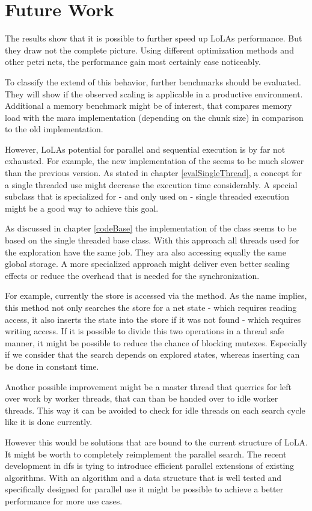 \chapter{Future Work}
The results show that it is possible to further speed up LoLAs performance. But they draw not the complete picture. Using different optimization methods and other petri nets, the performance gain most certainly ease noticeably.

To classify the extend of this behavior, further benchmarks should be evaluated. They will show if the observed scaling is applicable in a productive environment. Additional a memory benchmark might be of interest, that compares memory load with the mara implementation (depending on the chunk size) in comparison to the old implementation.

However, LoLAs potential for parallel and sequential execution is by far not exhausted. For example, the new implementation of the  seems to be much slower than the previous version. As stated in chapter \ref{evalSingleThread}, a concept for a single threaded use might decrease the execution time considerably. A special subclass that is specialized for - and only used on - single threaded execution might be a good way to achieve this goal.

As discussed in chapter \ref{codeBase} the implementation of the  class seems to be based on the single threaded base class. With this approach all threads used for the exploration have the same job. They ara also accessing equally the same global storage. A more specialized approach might deliver even better scaling effects or reduce the overhead that is needed for the synchronization.

For example, currently the store is accessed via the  method. As the name implies, this method not only searches the store for a net state - which requires reading access, it also inserts the state into the store if it was not found - which requires writing access. If it is possible to divide this two operations in a thread safe manner, it might be possible to reduce the chance of blocking mutexes. Especially if we consider that the search depends on explored states, whereas inserting can be done in constant time.

Another possible improvement might be a master thread that querries for left over work by worker threads, that can than be handed over to idle worker threads. This way it can be avoided to check for idle threads on each search cycle like it is done currently.

However this would be solutions that are bound to the current structure of LoLA. It might be worth to completely reimplement the parallel search. The recent development in dfs is tying to introduce efficient parallel extensions of existing algorithms\cite{bloemen2016multi}\cite{holzmann2008stack}. With an algorithm and a data structure that is well tested and specifically designed for parallel use it might be possible to achieve a better performance for more use cases.
